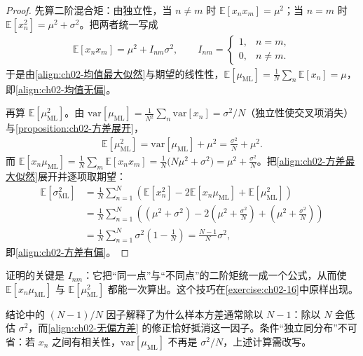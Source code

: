 \documentclass[../../main.tex]{subfiles}
\begin{document}
\begin{proof}
先算二阶混合矩：由独立性，当 $n\neq m$ 时 $\mathbb{E}[x_nx_m]=\mu^{2}$；当 $n=m$ 时 $\mathbb{E}[x_n^{2}]=\mu^{2}+\sigma^{2}$。把两者统一写成
\begin{align*}
 \mathbb{E}[x_nx_m] = \mu^{2} + I_{nm}\sigma^{2},\qquad
 I_{nm} = \begin{cases}1, & n=m,\\ 0, & n\neq m.\end{cases}
\end{align*}
于是由\eqref{align:ch02-均值最大似然}与期望的线性性，$\mathbb{E}[\mu_{\mathrm{ML}}]=\frac{1}{N}\sum_n\mathbb{E}[x_n]=\mu$，即\eqref{align:ch02-均值无偏}。

再算 $\mathbb{E}[\mu_{\mathrm{ML}}^{2}]$。由 $\mathrm{var}[\mu_{\mathrm{ML}}]=\frac{1}{N^{2}}\sum_{n}\mathrm{var}[x_n]=\sigma^{2}/N$（独立性使交叉项消失）与\cref{proposition:ch02-方差展开}，
\begin{align*}
 \mathbb{E}\left[\mu_{\mathrm{ML}}^{2}\right] = \mathrm{var}\left[\mu_{\mathrm{ML}}\right] + \mu^{2} = \frac{\sigma^{2}}{N} + \mu^{2} .
\end{align*}
而 $\mathbb{E}[x_n\mu_{\mathrm{ML}}]=\frac{1}{N}\sum_m\mathbb{E}[x_nx_m]=\frac{1}{N}\big(N\mu^{2}+\sigma^{2}\big)=\mu^{2}+\frac{\sigma^{2}}{N}$。把\eqref{align:ch02-方差最大似然}展开并逐项取期望：
\begin{align*}
 \mathbb{E}\left[\sigma_{\mathrm{ML}}^{2}\right]
 &= \frac{1}{N}\sum_{n=1}^{N}\left(\mathbb{E}[x_n^{2}] - 2\mathbb{E}[x_n\mu_{\mathrm{ML}}] + \mathbb{E}[\mu_{\mathrm{ML}}^{2}]\right) \\
 &= \frac{1}{N}\sum_{n=1}^{N}\left((\mu^{2}+\sigma^{2}) - 2\left(\mu^{2}+\frac{\sigma^{2}}{N}\right) + \left(\mu^{2}+\frac{\sigma^{2}}{N}\right)\right) \\
 &= \frac{1}{N}\sum_{n=1}^{N}\sigma^{2}\left(1-\frac{1}{N}\right) = \frac{N-1}{N}\sigma^{2} ,
\end{align*}
即\eqref{align:ch02-方差有偏}。
\end{proof}

\begin{remark}
证明的关键是 $I_{nm}$：它把“同一点”与“不同点”的二阶矩统一成一个公式，从而使 $\mathbb{E}[x_n\mu_{\mathrm{ML}}]$ 与 $\mathbb{E}[\mu_{\mathrm{ML}}^{2}]$ 都能一次算出。这个技巧在\cref{exercise:ch02-16}中原样出现。

结论中的 $(N-1)/N$ 因子解释了为什么样本方差通常除以 $N-1$：除以 $N$ 会低估 $\sigma^{2}$，而\eqref{align:ch02-无偏方差} 的修正恰好抵消这一因子。条件“独立同分布”不可省：若 $x_n$ 之间有相关性，$\mathrm{var}[\mu_{\mathrm{ML}}]$ 不再是 $\sigma^{2}/N$，上述计算需改写。
\end{remark}
\end{document}
